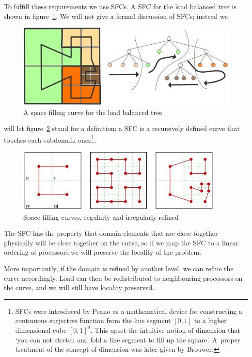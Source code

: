 To fulfill these requirements we use \acfp{SFC}. A \acf{SFC} for the
load balanced tree is shown in figure~\ref{fig:octree-sfc}. We will
not give a formal discussion of \acp{SFC}; instead we
\begin{figure}[ht]
  \includegraphics[scale=.18]{graphics-public/my_octree3}
  \caption{A space filling curve for the load balanced tree}
  \label{fig:octree-sfc}
\end{figure}
will let figure~\ref{fig:octree3} stand for a definition: a \ac{SFC} is a
recursively defined curve that touches each subdomain
once\footnote{\acfp{SFC} were introduced by Peano as a mathematical
  device for constructing a continuous surjective function from the
  line segment $[0,1]$ to a higher dimensional cube $[0,1]^d$. This
  upset the intuitive notion of dimension that `you can not stretch
  and fold a line segment to fill up the square'. A~proper treatment
  of the concept of dimension was later given by Brouwer.}.
\begin{figure}[ht]
  \includegraphics[scale=1]{graphics-public/octree3}
  \caption{Space filling curves, regularly and irregularly refined}
  \label{fig:octree3}
\end{figure}
The \ac{SFC} has the property that domain elements that are close
together physically will be close together on the curve, so if we map
the \ac{SFC} to a linear ordering of processors we will preserve the
locality of the problem. 

More importantly, if the domain is refined by
another level, we can refine the curve accordingly. Load can then be
redistributed to neighbouring processors on the curve, and we will
still have locality preserved.


\endinput
\Level 2 {Task migration}

An extreme case of load balancing is \indexterm{task migration}, where
a whole process is moved between processors.


